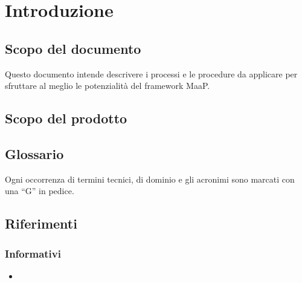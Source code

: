 \section{Introduzione}

	\subsection{Scopo del documento}
	Questo documento intende descrivere i processi e le procedure da applicare per sfruttare al meglio le potenzialità del framework MaaP.

	\subsection{Scopo del prodotto}
	\ScopoDelProdotto

	\subsection{Glossario}
	Ogni occorrenza di termini tecnici, di dominio e gli acronimi sono marcati con una ``G'' in pedice.


	\subsection{Riferimenti}
		\subsubsection{Informativi}
			\begin{itemize}
	  			\item
			\end{itemize}
	

